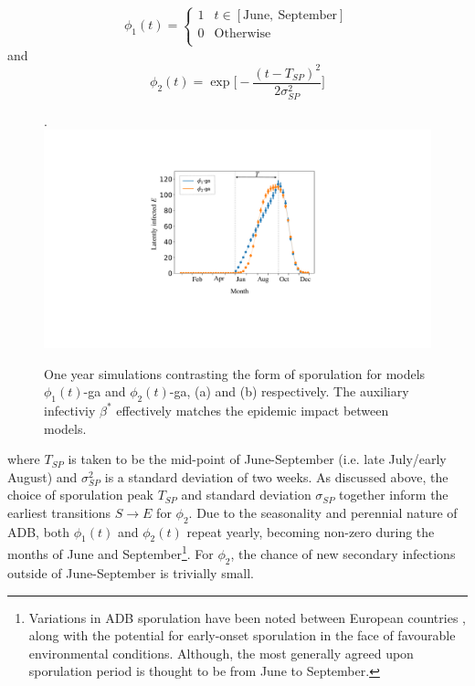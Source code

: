 \begin{equation}
\phi_1(t)  = \left\{
\begin{array}{ll}
      1 &  t \in [\mathrm{June,\ September}] \\
      0 & \mathrm{Otherwise} \\
\end{array} 
\right.
\end{equation}
and 
\begin{equation}
     \phi_2(t) =  \exp\big[-\frac{(t - T_{SP})^2}{2\sigma_{SP}^2}\big]
\end{equation}

\begin{figure}.
    \centering
    \includegraphics[scale=0.35]{chapter6/figures/fig5-sporulation.pdf}
    \caption{One year simulations contrasting the form of sporulation for models $\phi_1(t)$-ga and $\phi_2(t)$-ga, (a) and (b) respectively. The auxiliary infectiviy $\beta^*$ effectively matches the epidemic impact between models.}
    \label{fig:SEIR-sporulation}
\end{figure}

where $T_{SP}$ is taken to be the mid-point of June-September (i.e. late July/early August) and $\sigma_{SP}^2$ is a standard deviation of two weeks.
As discussed above, the choice of sporulation peak $T_{SP}$ and standard deviation $\sigma_{SP}$ together inform the earliest transitions $S\rightarrow E$ for $\phi_2$.
Due to the seasonality and perennial nature of ADB, both $\phi_1(t)$ and $\phi_2(t)$ repeat yearly, becoming non-zero during the months of June and September\footnote{Variations in ADB sporulation have been noted between European countries \cite{https://doi.org/10.1111/mpp.12073}, along with the potential for early-onset sporulation in the face of favourable environmental conditions. Although, the most generally agreed upon sporulation period is thought to be from June to September.}.
For $\phi_2$, the chance of new secondary infections outside of June-September is trivially small.

